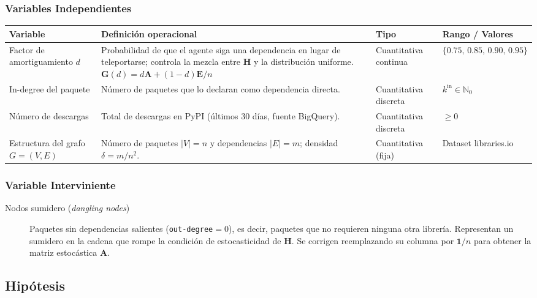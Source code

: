 \subsubsection{Variables Independientes}
\begin{center}
\begin{tabular}{p{3.5cm} p{3.5cm} p{2.5cm} p{3cm}}
\toprule
\textbf{Variable} & \textbf{Definición operacional} & \textbf{Tipo} & \textbf{Rango / Valores} \\
\midrule
Factor de amortiguamiento $d$ &
    Probabilidad de que el agente siga una dependencia en lugar de teleportarse;
    controla la mezcla entre $\mathbf{H}$ y la distribución uniforme.
    $\mathbf{G}(d) = d\mathbf{A} + (1-d)\mathbf{E}/n$ &
    Cuantitativa continua &
    $\{0.75,\, 0.85,\, 0.90,\, 0.95\}$ \\[10pt]
In-degree del paquete &
    Número de paquetes que lo declaran como dependencia directa. &
    Cuantitativa discreta &
    $k^{\text{in}} \in \mathbb{N}_0$ \\[10pt]
Número de descargas &
    Total de descargas en PyPI (últimos 30 días, fuente BigQuery). &
    Cuantitativa discreta &
    $\geq 0$ \\[10pt]
Estructura del grafo $G=(V,E)$ &
    Número de paquetes $|V|=n$ y dependencias $|E|=m$; densidad $\delta = m/n^2$. &
    Cuantitativa (fija) &
    Dataset libraries.io \\
\bottomrule
\end{tabular}
\end{center}

\subsubsection{Variable Interviniente}
\begin{description}
    \item[Nodos sumidero (\textit{dangling nodes})] Paquetes sin dependencias
        salientes (\texttt{out-degree}$=0$), es decir, paquetes que no requieren
        ninguna otra librería. Representan un sumidero en la cadena que rompe la
        condición de estocasticidad de $\mathbf{H}$. Se corrigen reemplazando
        su columna por $\mathbf{1}/n$ para obtener la matriz estocástica
        $\mathbf{A}$.
\end{description}

\subsection{Hipótesis}

